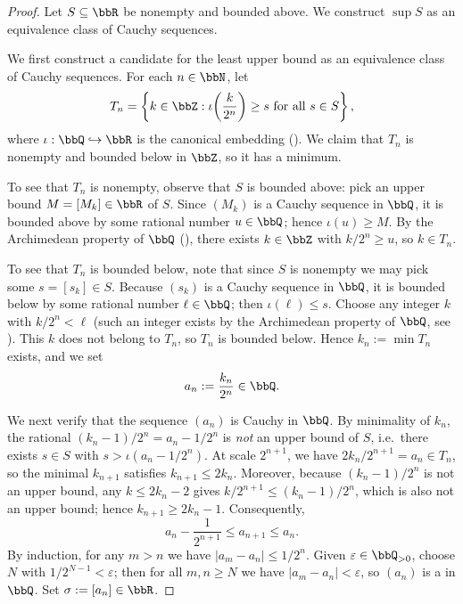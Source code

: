 \begin{proof}
    Let $S \subseteq \bbR$ be nonempty and bounded above. We construct $\sup S$ as an equivalence class of Cauchy sequences.

    We first construct a candidate for the least upper bound as an equivalence class of Cauchy sequences. For each $n \in \bbN$, let
    $$T_n = \left\{ k \in \bbZ : \iota\!\left(\frac{k}{2^n}\right) \ge s \text{ for all } s \in S \right\},$$
    where $\iota: \bbQ \hookrightarrow \bbR$ is the canonical embedding (). We claim that $T_n$ is nonempty and bounded below in $\bbZ$, so it has a minimum.

    To see that $T_n$ is nonempty, observe that $S$ is bounded above: pick an upper bound $M = [M_k] \in \bbR$ of $S$. Since $(M_k)$ is a Cauchy sequence in $\bbQ$, it is bounded above by some rational number $u \in \bbQ$; hence $\iota(u) \ge M$. By the Archimedean property of $\bbQ$ (), there exists $k \in \bbZ$ with $k/2^n \ge u$, so $k \in T_n$.

    To see that $T_n$ is bounded below, note that since $S$ is nonempty we may pick some $s = [s_k] \in S$. Because $(s_k)$ is a Cauchy sequence in $\bbQ$, it is bounded below by some rational number $\ell \in \bbQ$; then $\iota(\ell) \le s$. Choose any integer $k$ with $k/2^n < \ell$ (such an integer exists by the Archimedean property of $\bbQ$, see ). This $k$ does not belong to $T_n$, so $T_n$ is bounded below. Hence $k_n := \min T_n$ exists, and we set
    $$a_n := \frac{k_n}{2^n} \in \bbQ.$$

    We next verify that the sequence $(a_n)$ is Cauchy in $\bbQ$.
    By minimality of $k_n$, the rational $(k_n-1)/2^n = a_n - 1/2^n$ is \emph{not} an upper bound of $S$, i.e.\ there exists $s \in S$ with $s > \iota(a_n - 1/2^n)$. At scale $2^{n+1}$, we have $2k_n/2^{n+1} = a_n \in T_n$, so the minimal $k_{n+1}$ satisfies $k_{n+1} \le 2k_n$. Moreover, because $(k_n-1)/2^n$ is not an upper bound, any $k \le 2k_n - 2$ gives $k/2^{n+1} \le (k_n-1)/2^n$, which is also not an upper bound; hence $k_{n+1} \ge 2k_n - 1$. Consequently,
    $$a_n - \frac{1}{2^{n+1}} \le a_{n+1} \le a_n.$$
    By induction, for any $m > n$ we have $|a_m - a_n| \le 1/2^n$. Given $\varepsilon \in \bbQ_{>0}$, choose $N$ with $1/2^{N-1} < \varepsilon$; then for all $m, n \ge N$ we have $|a_m - a_n| < \varepsilon$, so $(a_n)$ is a  in $\bbQ$. Set $\sigma := [a_n] \in \bbR$.


\end{proof}
